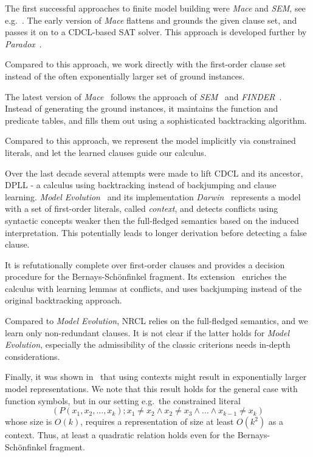 \documentclass[a4paper]{article}
\newcommand{\mEPR}{Bernays-Sch\"onfinkel}
\newcommand{\eg}{e.g.\ }
\begin{document}
The first successful approaches to finite model building were \emph{Mace} and \emph{SEM}, see e.g.\ \cite{Tammet03finitemodel}.
The early version of \emph{Mace} flattens and grounds the given clause set, and passes it on to a CDCL-based SAT solver. 
This approach is developed further by \emph{Paradox}~\cite{ParadoxRef}. 

Compared to this approach, we work directly with the first-order clause set instead of the often exponentially larger set of ground instances.

The latest version of \emph{Mace}~\cite{Mace4Ref03} follows the approach of \emph{SEM}~\cite{SEMRef95} and \emph{FINDER}~\cite{FinderRef94}. 
Instead of generating the ground instances, 
it maintains the function and predicate tables, and fills them out using a sophisticated backtracking algorithm. 

Compared to this approach, we represent the model implicitly via constrained literals,  
and let the learned clauses guide our calculus.

Over the last decade several attempts were made to lift CDCL and its ancestor, DPLL - 
a calculus using backtracking instead of backjumping and clause learning. 
\emph{Model Evolution}~\cite{ModelEvolution03} and its implementation \emph{Darwin}~\cite{Darwin04}
represents a model with a set of first-order literals, called \emph{context}, and 
detects conflicts using syntactic concepts weaker then the full-fledged semantics based on
the induced interpretation.
This potentially leads to longer derivation before detecting a false clause.

It is refutationally complete over first-order clauses and provides a 
decision procedure for the {\mEPR} fragment. 
Its extension~\cite{ModelEvolutionLemma06} enriches the calculus with learning lemmas at conflicts, 
and uses backjumping instead of the original backtracking approach. 

Compared to \emph{Model Evolution}, NRCL relies on the full-fledged semantics,  
and we learn only non-redundant clauses.
It is not clear if the latter holds for \emph{Model Evolution}, 
especially the admissibility of the classic criterions
needs in-depth considerations.

Finally, it was shown in~\cite{FermullerCADE05} that using contexts might result in exponentially larger model representations.
We note that this result holds for the general case with function symbols, but in our setting \eg the constrained literal
\[(P(x_1, x_2, \dots, x_k); x_1 \ne x_2 \land x_2 \ne x_3 \land \dots \land x_{k-1} \ne x_k)\]
whose size is $O(k)$, requires a representation of size at least $O(k^2)$ as a context.
Thus, at least a quadratic relation holds even for the {\mEPR} fragment.
\end{document}
